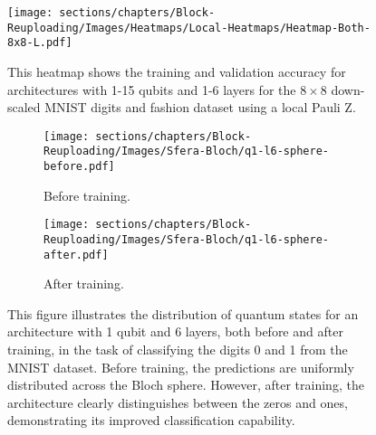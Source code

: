 \begin{figure}[H]
    \centering
    \texttt{[image: sections/chapters/Block-Reuploading/Images/Heatmaps/Local-Heatmaps/Heatmap-Both-8x8-L.pdf]}
    \caption{This heatmap shows the training and validation accuracy for architectures with 1-15 qubits and
    1-6 layers for the $8\times8$ down-scaled MNIST digits and fashion dataset using a local Pauli Z.}
    \label{fig:heatmap-8x8-L}
\end{figure}

\begin{figure}[H]
    \centering
    \begin{subfigure}[b]{0.45\textwidth}
        \texttt{[image: sections/chapters/Block-Reuploading/Images/Sfera-Bloch/q1-l6-sphere-before.pdf]}
        \caption{Before training.}
    \end{subfigure}
    \begin{subfigure}[b]{0.45\textwidth}
        \texttt{[image: sections/chapters/Block-Reuploading/Images/Sfera-Bloch/q1-l6-sphere-after.pdf]}
        \caption{After training.}
    \end{subfigure}
    \caption{This figure illustrates the distribution of quantum states for an architecture with 
    1 qubit and 6 layers, both before and after training, in the task of classifying the digits 
    0 and 1 from the MNIST dataset. Before training, the predictions are uniformly distributed 
    across the Bloch sphere. However, after training, the architecture clearly distinguishes between 
    the zeros and ones, demonstrating its improved classification capability.}
    \label{fig:sfere-A-B}
\end{figure}